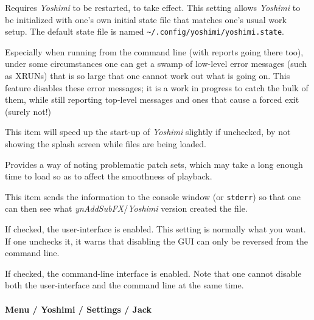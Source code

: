    \setcounter{ItemCounter}{0}      %

   Requires \textsl{Yoshimi} to be restarted, to take effect.
   This setting allows \textsl{Yoshimi} to be initialized with one's own
   initial state file that matches one's usual work setup.
   The default state file is named
   \texttt{\textasciitilde/.config/yoshimi/yoshimi.state}.

   Especially when running from the command line (with reports going there
   too), under some circumstances one can get a swamp of low-level error
   messages (such as XRUNs) that is so large that one cannot work out what is
   going on. This feature disables these error messages; it is a work in
   progress to catch the bulk of them, while still reporting top-level messages
   and ones that cause a forced exit (surely not!)

   This item will speed up the start-up of \textsl{Yoshimi} slightly
   if unchecked, by not showing the splash screen while files are being loaded.

   Provides a way of noting problematic patch sets, which may take a long
   enough time to load so as to affect the smoothness of playback.

   This item sends the information to the console window
   (or \texttt{stderr}) so that
   one can then see what \textsl{ynAddSubFX}/\textsl{Yoshimi}
   version created the file.

   If checked, the user-interface is enabled.  This setting is normally what you
   want.  If one unchecks it, it warns that disabling the GUI
   can only be reversed from the command line.

   If checked, the command-line interface is enabled.
   Note that one cannot disable both the user-interface and the command line
   at the same time.

\paragraph{Menu / Yoshimi / Settings / Jack}
\label{paragraph:menu_yoshimi_settings_jack}

